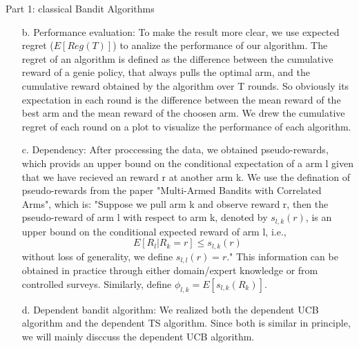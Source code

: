 \documentclass{article}
\begin{document}
\begin{homeworkProblem}{Part 1: classical Bandit Algorithms}
\begin{enumerate}
\begin{enumerate}
            So besides using computer generated data to test our dependent bandit algorithm, we also used authentic data downloaded from the internet.
            We considered the real-life application of the dependent multi-arm bandit problem, more specifically, the problem of movie promotion.
            For app designers, they want to push book advertisments accorrding to user preference, and user preference is linked to certain traits of the user in question.
            We downloaded a dataset of viewer ratings on movies. The choice of movie we push for the viewer is the arm we choose, and the viewer's final rating is the reward.
            To match a three arm bandit machine, we implemented the dependent algorithm on choosing three movies to promote.
            \item[b.] Performance evaluation:
            To make the result more clear, we use expected regret ($E[Reg(T)]$) to analize the performance of our algorithm.
            The regret of an algorithm is defined as the difference between the cumulative reward of a genie policy, that always pulls the optimal arm, and the cumulative reward obtained by the algorithm over T rounds.
            So obviously its expectation in each round is the difference between the mean reward of the best arm and the mean reward of the choosen arm.
            We drew the cumulative regret of each round on a plot to visualize the performance of each algorithm.
            \item[c.] Dependency:
            After proccessing the data, we obtained pseudo-rewards, which provids an upper bound on the conditional expectation of a arm l given that we have recieved an reward r at another arm k.
            We use the defination of pseudo-rewards from the paper "Multi-Armed Bandits with Correlated Arms", which is: "Suppose we pull arm k and observe reward r, then the pseudo-reward of arm l with respect to arm k, denoted by $s_{l,k}(r)$, 
            is an upper bound on the conditional expected reward of arm l, i.e.,$$E[R_l|R_k = r]\leqslant s_{l,k}(r)$$ without loss of generality, we define $s_{l,l}(r)=r$."
            This information can be obtained in practice through either domain/expert knowledge or from controlled surveys. 
            Similarly, define $\phi_{l,k} = E[s_{l,k}(R_k)]$.
            \item[d.] Dependent bandit algorithm:
            We realized both the dependent UCB algorithm and the dependent TS algorithm. Since both is similar in principle, we will mainly disccuss the dependent UCB algorithm.\\

\end{enumerate}
\end{enumerate}
\end{homeworkProblem}
\end{document}
